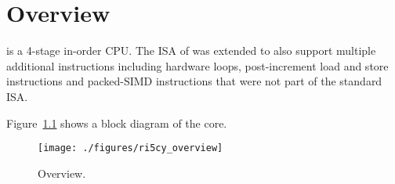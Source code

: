 \chapter{Overview}

\rvcore is a 4-stage in-order \riscv CPU. The ISA of \rvcore was extended to
also support multiple additional instructions including hardware loops,
post-increment load and store instructions and packed-SIMD instructions that
were not part of the standard \riscv ISA.

Figure~\ref{fig:ri5cy_overview} shows a block diagram of the core.

\begin{figure}[H]
  \centering
  \texttt{[image: ./figures/ri5cy\_overview]}
  \caption{\rvcore Overview.}
  \label{fig:ri5cy_overview}
\end{figure}
